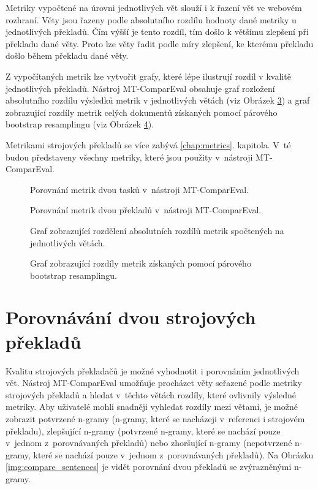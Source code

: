 Metriky vypočtené na úrovni jednotlivých vět slouží i k řazení vět ve webovém rozhraní.
Věty jsou řazeny podle absolutního rozdílu hodnoty dané metriky u jednotlivých překladů.
Čím výšší je tento rozdíl, tím došlo k většímu zlepšení při překladu dané věty.
Proto lze věty řadit podle míry zlepšení, ke kterému překladu došlo během překladu dané věty. 

Z vypočítaných metrik lze vytvořit grafy,
  které lépe ilustrují rozdíl v kvalitě jednotlivých překladů.
Nástroj \mbox{MT-ComparEval} obsahuje graf rozložení absolutního rozdílu výsledků metrik v jednotlivých větách (viz Obrázek \ref{img:chart-metrics-sentences})
  a graf zobrazující rozdíly metrik celých dokumentů získaných pomocí párového bootstrap resamplingu (viz Obrázek \ref{img:chart-metrics-bs}).

Metrikami strojových překladů se více zabývá \ref{chap:metrics}. kapitola.
V~té budou představeny všechny metriky,
  které jsou použity v~nástroji \mbox{MT-ComparEval}.


\begin{figure}
	\caption{Porovnání metrik dvou tasků v~nástroji \mbox{MT-ComparEval}.}
	\label{img:compare_metrics_tasks}
\end{figure}

\begin{figure}
	\caption{Porovnání metrik dvou překladů v~nástroji \mbox{MT-ComparEval}.}
	\label{img:compare_metrics_sentences}
\end{figure}

\begin{figure}
	\caption{Graf zobrazující rozdělení absolutních rozdílů metrik spočtených na jednotlivých větách.}
	\label{img:chart-metrics-sentences}
\end{figure}

\begin{figure}
	\caption{Graf zobrazující rozdíly metrik získaných pomocí párového bootstrap resamplingu.}
	\label{img:chart-metrics-bs}
\end{figure}

\section{Porovnávání dvou strojových překladů}
Kvalitu strojových překladačů je možné vyhodnotit i porovnáním jednotlivých vět.
Nástroj \mbox{MT-ComparEval} umožňuje procházet věty seřazené podle metriky strojových překladů 
  a hledat v~těchto větách rozdíly,
  které ovlivnily výsledné metriky.
Aby uživatelé mohli snadněji vyhledat rozdíly mezi větami,
  je možné zobrazit potvrzené \mbox{n-gramy} (\mbox{n-gramy}, které se nacházeji v~referenci i strojovém překladu),
  zlepšující \mbox{n-gramy} (potvrzené \mbox{n-gramy}, které se nachází pouze v~jednom z~porovnávaných překladů)
  nebo zhoršující \mbox{n-gramy} (nepotvrzené \mbox{n-gramy}, které se nachází pouze v~jednom z~porovnávaných překladů).
Na Obrázku \ref{img:compare_sentences} je vidět porovnání dvou překladů se zvýrazněnými \mbox{n-gramy}.

